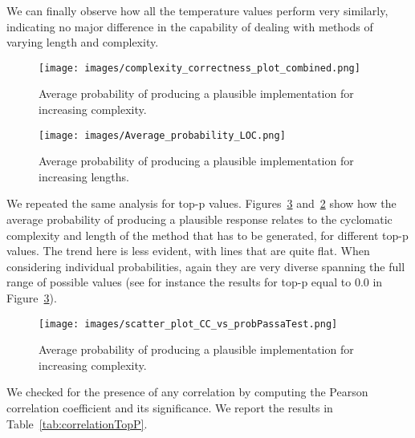 We can finally observe how all the temperature values perform very similarly, indicating no major difference in the capability of dealing with methods of varying length and complexity.

\begin{figure}[ht]
        \centering
        \texttt{[image: images/complexity\_correctness\_plot\_combined.png]}
        \caption{Average probability of producing a plausible implementation for increasing complexity.}
        \label{fig:corrCCTopp}
\end{figure}

\begin{figure}[ht]
        \centering
        \texttt{[image: images/Average\_probability\_LOC.png]}
        \caption{Average probability of producing a plausible implementation for increasing lengths.}
        \label{fig:corrLocTopp}
\end{figure}


We repeated the same analysis for top-p values. Figures~\ref{fig:corrCCTopp}  and~\ref{fig:corrLocTopp} show how the average probability of producing a plausible response relates to the cyclomatic complexity and length of the method that has to be generated, for different top-p values. The trend here is less evident, with lines that are quite flat. When considering individual probabilities, again they are very diverse spanning the full range of possible values (see for instance the results for top-p equal to $0.0$ in Figure~\ref{fig:corrCCTopp}).

\begin{figure}[ht]
        \centering
        \texttt{[image: images/scatter\_plot\_CC\_vs\_probPassaTest.png]}
        \caption{Average probability of producing a plausible implementation for increasing complexity.}
        \label{fig:corrCCTopp}
\end{figure}

We checked for the presence of any correlation by computing the Pearson correlation coefficient and its significance. We report the results in Table~\ref{tab:correlationTopP}.

